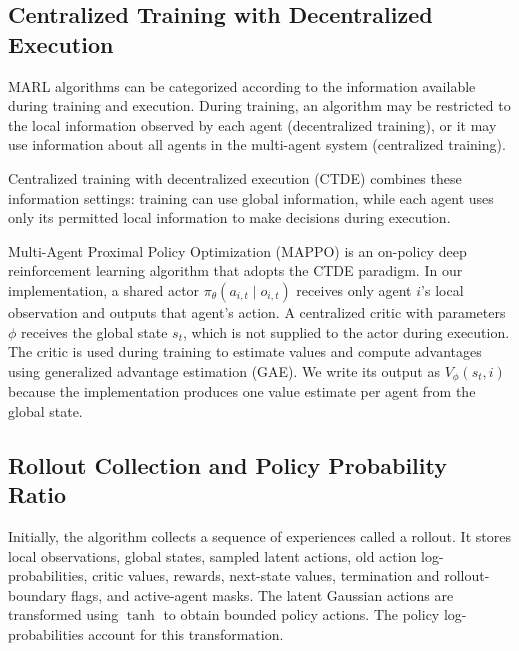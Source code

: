 \documentclass[letterpaper,10pt,conference]{ieeeconf}
\begin{document}
\subsection{Centralized Training with Decentralized Execution}

MARL algorithms can be categorized according to the information available
during training and execution. During training, an algorithm may be
restricted to the local information observed by each agent
(decentralized training), or it may use information about all agents in
the multi-agent system (centralized training).

Centralized training with decentralized execution (CTDE) combines these
information settings: training can use global information, while each agent
uses only its permitted local information to make decisions during execution.

Multi-Agent Proximal Policy Optimization (MAPPO) is an on-policy deep
reinforcement learning algorithm that adopts the CTDE paradigm. In our
implementation, a shared actor $\pi_\theta(a_{i,t}\mid o_{i,t})$ receives
only agent $i$'s local observation and outputs that agent's action. A
centralized critic with parameters $\phi$ receives the global state $s_t$,
which is not supplied to the actor during execution. The critic is used
during training to estimate values and compute advantages using generalized
advantage estimation (GAE). We write its output as $V_\phi(s_t,i)$ because
the implementation produces one value estimate per agent from the global
state.

\subsection{Rollout Collection and Policy Probability Ratio}

Initially, the algorithm collects a sequence of experiences called a
rollout. It stores local observations, global states, sampled latent actions,
old action log-probabilities, critic values, rewards, next-state values,
termination and rollout-boundary flags, and active-agent masks. The latent
Gaussian actions are transformed using $\tanh$ to obtain bounded policy
actions. The policy log-probabilities account for this transformation.
\end{document}
